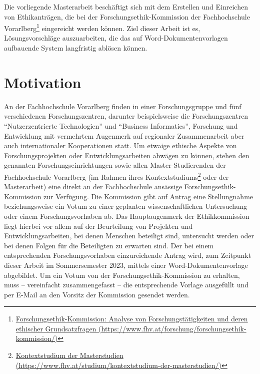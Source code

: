 Die vorliegende Masterarbeit beschäftigt sich mit dem Erstellen und Einreichen von Ethikanträgen, die bei der Forschungsethik-Kommission der Fachhochschule Vorarlberg\footnote{\href{https://www.fhv.at/forschung/forschungsethik-kommission/}{Forschungsethik-Kommission: Analyse von Forschungstätigkeiten und deren ethischer Grundsatzfragen (\url{https://www.fhv.at/forschung/forschungsethik-kommission/)}}} eingereicht werden können. Ziel dieser Arbeit ist es, Lösungsvorschläge auszuarbeiten, die das auf Word-Dokumentenvorlagen aufbauende System langfristig ablösen können.

\section{Motivation}
\label{sec:motivation}

An der Fachhochschule Vorarlberg finden in einer Forschungsgruppe und fünf verschiedenen Forschungszentren, darunter beispielsweise die Forschungszentren \enquote{Nutzerzentrierte Technologien} und \enquote{Business Informatics}, Forschung und Entwicklung mit vermehrtem Augenmerk auf regionaler Zusammenarbeit aber auch internationaler Kooperationen statt.\cite{fachhochschule_vorarlberg_gmbh_forschung_2021} Um etwaige ethische Aspekte von Forschungsprojekten oder Entwicklungsarbeiten abwägen zu können, stehen den genannten Forschungseinrichtungen sowie allen Master-Studierenden der Fachhochschule Vorarlberg (im Rahmen ihres Kontextstudiums\footnote{\href{https://www.fhv.at/studium/kontextstudium-der-masterstudien/}{Kontextstudium der Masterstudien (\url{https://www.fhv.at/studium/kontextstudium-der-masterstudien/)}}} oder der Masterarbeit) eine direkt an der Fachhochschule ansässige Forschungsethik-Kommission zur Verfügung. Die Kommission gibt auf Antrag eine Stellungnahme beziehungsweise ein Votum zu einer geplanten wissenschaftlichen Untersuchung oder einem Forschungsvorhaben ab. Das Hauptaugenmerk der Ethikkommission liegt hierbei vor allem auf der Beurteilung von Projekten und Entwicklungsarbeiten, bei denen Menschen beteiligt sind, untersucht werden oder bei denen Folgen für die Beteiligten zu erwarten sind. Der bei einem entsprechenden Forschungsvorhaben einzureichende Antrag wird, zum Zeitpunkt dieser Arbeit im Sommersemester 2023, mittels einer Word-Dokumentenvorlage abgebildet. Um ein Votum von der Forschungsethik-Kommission zu erhalten, muss -- vereinfacht zusammengefasst -- die entsprechende Vorlage ausgefüllt und per E-Mail an den Vorsitz der Kommission gesendet werden.\cite{fachhochschule_vorarlberg_gmbh_forschungsethik-kommission_2021}

